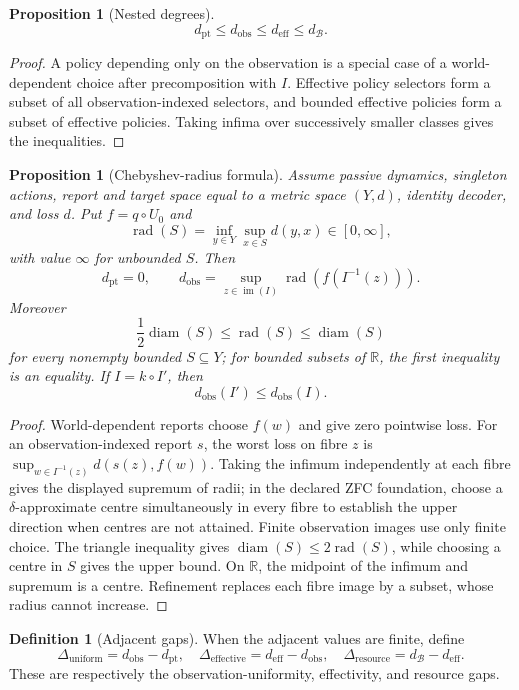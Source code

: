 \documentclass[11pt]{article}
\theoremstyle{plain}
\newtheorem{proposition}[theorem]{Proposition}
\theoremstyle{definition}
\newtheorem{definition}[theorem]{Definition}
\theoremstyle{remark}
\newcommand{\im}{\operatorname{im}}
\begin{document}
\begin{proposition}[Nested degrees]\label{prop:tax}
\[
d_{\mathrm{pt}}
\le d_{\mathrm{obs}}
\le d_{\mathrm{eff}}
\le d_{\mathcal B}.
\]
\end{proposition}

\begin{proof}
A policy depending only on the observation is a special case of a world-dependent
choice after precomposition with $I$. Effective policy selectors form a subset
of all observation-indexed selectors, and bounded effective policies form a
subset of effective policies. Taking infima over successively smaller classes
gives the inequalities.
\end{proof}

\begin{proposition}[Chebyshev-radius formula]\label{prop:chebyshev}
Assume passive dynamics, singleton actions, report and target space equal to a
metric space $(Y,d)$, identity decoder, and loss $d$. Put $f=q\circ U_0$ and
\[
\operatorname{rad}(S)=\inf_{y\in Y}\sup_{x\in S}d(y,x)
\in[0,\infty],
\]
with value $\infty$ for unbounded $S$. Then
\[
d_{\mathrm{pt}}=0,
\qquad
d_{\mathrm{obs}}
=\sup_{z\in\im(I)}
\operatorname{rad}(f(I^{-1}(z))).
\]
Moreover
\[
\frac12\operatorname{diam}(S)
\le\operatorname{rad}(S)
\le\operatorname{diam}(S)
\]
for every nonempty bounded $S\subseteq Y$; for bounded subsets of $\mathbb R$,
the first inequality is an equality. If $I=k\circ I'$, then
\[
d_{\mathrm{obs}}(I')\le d_{\mathrm{obs}}(I).
\]
\end{proposition}

\begin{proof}
World-dependent reports choose $f(w)$ and give zero pointwise loss. For an
observation-indexed report $s$, the worst loss on fibre $z$ is
$\sup_{w\in I^{-1}(z)}d(s(z),f(w))$. Taking the infimum independently at each
fibre gives the displayed supremum of radii; in the declared ZFC foundation,
choose a $\delta$-approximate centre simultaneously in every fibre to establish
the upper direction when centres are not attained. Finite observation images
use only finite choice. The triangle inequality gives
$\operatorname{diam}(S)\le2\operatorname{rad}(S)$, while choosing a centre in
$S$ gives the upper bound. On $\mathbb R$, the midpoint of the infimum and
supremum is a centre. Refinement replaces each fibre image by a subset, whose
radius cannot increase.
\end{proof}



\begin{definition}[Adjacent gaps]\label{def:tax}
When the adjacent values are finite, define
\[
\Delta_{\mathrm{uniform}}=d_{\mathrm{obs}}-d_{\mathrm{pt}},\quad
\Delta_{\mathrm{effective}}=d_{\mathrm{eff}}-d_{\mathrm{obs}},\quad
\Delta_{\mathrm{resource}}=d_{\mathcal B}-d_{\mathrm{eff}}.
\]
These are respectively the observation-uniformity, effectivity, and resource
gaps.
\end{definition}
\end{document}
